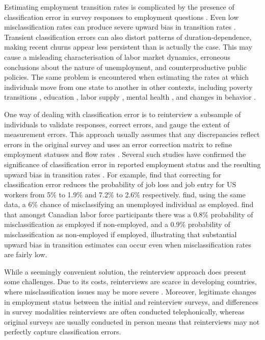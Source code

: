 \documentclass[letterpaper,12pt,final,dvipsnames]{article}
\begin{document}
Estimating employment transition rates is complicated by the presence of classification error in survey responses to employment questions \citep{meyer1988}. Even low misclassification rates can produce severe upward bias in transition rates \citep{porteba1986, singh1995}. Transient classification errors can also distort patterns of duration-dependence, making recent churns appear less persistent than is actually the case. This may cause a misleading characterisation of labor market dynamics, erroneous conclusions about the nature of unemployment, and counterproductive public policies. The same problem is encountered when estimating the rates at which individuals move from one state to another in other contexts, including poverty transitions \citep{Bigsten2008}, education \citep{fredriksson1997economic}, labor supply \citep{cairo2022cyclicality}, mental health \citep{van2017critique}, and changes in behavior \citep{khosravi2018transition}. 

One way of dealing with classification error is to reinterview a subsample of individuals to validate responses, correct errors, and gauge the extent of measurement errors. This approach usually assumes that any discrepancies reflect errors in the original survey and uses an error correction matrix to refine employment statuses and flow rates \citep{abowd1985, porteba1986}. Several such studies have confirmed the significance of classification error in reported employment status and the resulting upward bias in transition rates \citep{magnac1999, singh1995, chua1987, porteba1986}. For example,  \citet{porteba1986} find that correcting for classification error reduces the probability of job loss and job entry for US workers from 5\% to 1.9\% and 7.2\% to 2.6\% respectively. \citet{chua1987} find, using the same data, a 6\% chance of misclassifying an unemployed individual as employed. \citet{singh1995} find that amongst Canadian labor force participants there was a 0.8\% probability of misclassification as employed if non-employed, and a 0.9\% probability of misclassification as non-employed if employed, illustrating that substantial upward bias in transition estimates can occur even when misclassification rates are fairly low. 

While a seemingly convenient solution, the reinterview approach does present some challenges. Due to its costs, reinterviews are scarce in developing countries, where misclassification issues may be more severe \citep{ashenfelter1986}. Moreover, legitimate changes in employment status between the initial and reinterview surveys, and differences in survey modalities \textemdash reinterviews are often conducted telephonically, whereas original surveys are usually conducted in person \textemdash means that reinterviews may not perfectly capture classification errors. 
\end{document}
